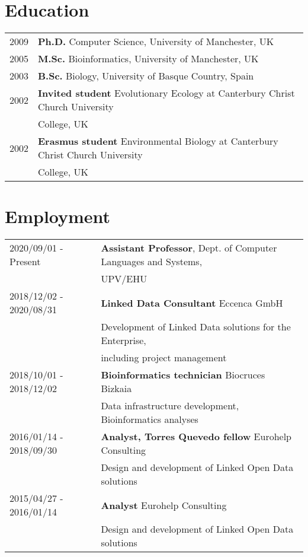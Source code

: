 \documentclass[11pt,fullpage]{article}
\begin{document}

\section*{Education}

\begin{tabular}{ll}
	2009 & {\bf Ph.D.} Computer Science, University of Manchester, UK \\
	2005 & {\bf M.Sc.} Bioinformatics, University of Manchester, UK \\
	2003 & {\bf B.Sc.} Biology, University of Basque Country, Spain \\
	2002 & {\bf Invited student} Evolutionary Ecology at Canterbury Christ Church University \\
	     & College, UK \\
	2002 & {\bf Erasmus student} Environmental Biology at Canterbury Christ Church University \\
	     & College, UK \\
\end{tabular}

\section*{Employment}


\begin{tabular}{ll}
2020/09/01 - Present & {\bf Assistant Professor}, Dept. of Computer Languages and Systems, \\
                    & UPV/EHU \\
2018/12/02 - 2020/08/31 & {\bf Linked Data Consultant} Eccenca GmbH \\
      & Development of Linked Data solutions for the Enterprise, \\ 
      & including project management\\
2018/10/01 - 2018/12/02 & {\bf Bioinformatics technician} Biocruces Bizkaia \\
      & Data infrastructure development, Bioinformatics analyses \\
2016/01/14 - 2018/09/30 & {\bf Analyst, Torres Quevedo fellow} Eurohelp Consulting \\
	      & Design and development of Linked Open Data solutions\\
 2015/04/27 -  2016/01/14 & {\bf Analyst} Eurohelp Consulting \\
	    & Design and development of Linked Open Data solutions\\
\end{tabular}
\end{document}
